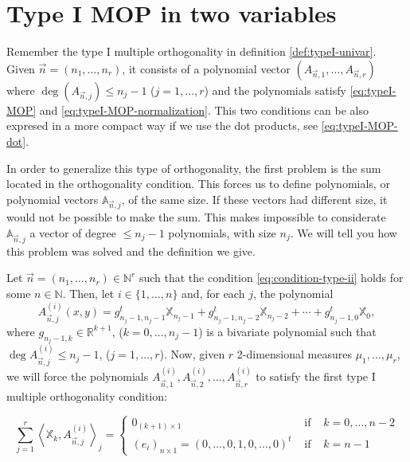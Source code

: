 \documentclass[12pt,a4]{article}
\theoremstyle{plain}
\newcommand{\R}[0]{\mathbb{R}}
\newcommand{\N}[0]{\mathbb{N}}
\newcommand{\prodesc}[2]{\left\langle #1 , #2 \right\rangle}
\begin{document}
\section{Type I MOP in two variables}

Remember the type I multiple orthogonality in definition \ref{def:typeI-univar}. Given $\vec n =(n_1,\dots,n_r)$, it consists of a polynomial vector $(A_{\vec n,1},\dots,A_{\vec n, r})$ where $\deg(A_{\vec n,j})\leq n_j-1$ ($j=1,\dots,r$) and the polynomials satisfy \eqref{eq:typeI-MOP} and \eqref{eq:typeI-MOP-normalization}. This two conditions can be also expresed in a more compact way if we use the dot products, see \eqref{eq:typeI-MOP-dot}.

In order to generalize this type of orthogonality, the first problem is the sum located in the orthogonality condition. This forces us to define polynomials, or polynomial vectors $\mathbb A_{\vec n, j}$, of the same size. If these vectors had different size, it would not be possible to make the sum. This makes impossible to considerate $\mathbb A_{\vec n,j}$ a vector of degree $\leq n_j-1$ polynomials, with size $n_j$. We will tell you how this problem was solved and the definition we give.

Let $\vec n = (n_1,\dots,n_r)\in\N^r$ such that the condition \eqref{eq:condition-type-ii} holds for some $n\in\N$. Then, let $i\in\{1,\dots,n\}$ and, for each $j$, the polynomial $$A_{\vec n, j}^{(i)}(x,y) = g_{n_j-1,n_j-1}^t \mathbb X_{n_j-1} + g_{n_j-1,n_j-2}^t \mathbb X_{n_j-2} + \cdots + g_{n_j-1,0}^t \mathbb X_{0},$$ where $g_{n_j-1,k}\in\R^{k+1}$, ($k=0,\dots,n_j-1$) is a bivariate polynomial such that $\deg A_{\vec n, j}^{(i)} \leq n_j-1$, ($j=1,\dots,r$). Now, given $r$ 2-dimensional measures $\mu_1,\dots,\mu_r$, we will force the polynomials $A_{\vec n, 1}^{(i)}, A_{\vec n, 2}^{(i)}, \dots, A_{\vec n, r}^{(i)}$ to satisfy the first type I multiple orthogonality condition:

\begin{equation}
    \label{eq:first-condition-type-I}
    \sum_{j=1}^r \prodesc{\mathbb X_k}{A_{\vec n,j}^{(i)}}_j = \left\{\begin{array}{ccl}
        0_{(k+1)\times 1} &   \text{ if } & k=0,\dots,n-2 \\
        (e_i)_{n\times 1} = (0,\dots,0,1,0,\dots,0)^t & \text{ if } & k=n-1      
    \end{array}\right.
\end{equation}
\end{document}

